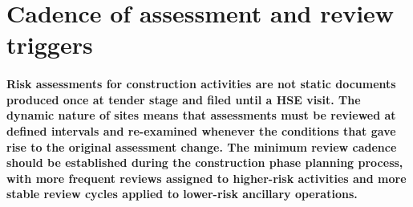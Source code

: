 \begin{itemize}
\end{itemize}

\section{Cadence of assessment and review triggers}

\paragraph{Risk assessments for construction activities are not static documents produced once at tender stage and filed until a HSE visit. The dynamic nature of sites means that assessments must be reviewed at defined intervals and re-examined whenever the conditions that gave rise to the original assessment change. The minimum review cadence should be established during the construction phase planning process, with more frequent reviews assigned to higher-risk activities and more stable review cycles applied to lower-risk ancillary operations.}

